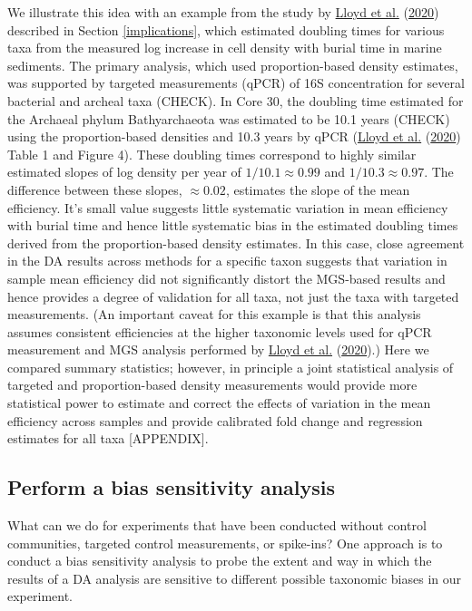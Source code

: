 \documentclass[
]{article}
\theoremstyle{definition}
\theoremstyle{definition}
\theoremstyle{definition}
\theoremstyle{definition}
\theoremstyle{remark}
\begin{document}
We illustrate this idea with an example from the study by \protect\hyperlink{ref-lloyd2020evid}{Lloyd et al.} (\protect\hyperlink{ref-lloyd2020evid}{2020}) described in Section \ref{implications}, which estimated doubling times for various taxa from the measured log increase in cell density with burial time in marine sediments.
The primary analysis, which used proportion-based density estimates, was supported by targeted measurements (qPCR) of 16S concentration for several bacterial and archeal taxa (CHECK).
In Core 30, the doubling time estimated for the Archaeal phylum Bathyarchaeota was estimated to be 10.1 years (CHECK) using the proportion-based densities and 10.3 years by qPCR (\protect\hyperlink{ref-lloyd2020evid}{Lloyd et al.} (\protect\hyperlink{ref-lloyd2020evid}{2020}) Table 1 and Figure 4).
These doubling times correspond to highly similar estimated slopes of log density per year of \(1/10.1 \approx 0.99\) and \(1/10.3\approx 0.97\).
The difference between these slopes, \(\approx 0.02\), estimates the slope of the mean efficiency.
It's small value suggests little systematic variation in mean efficiency with burial time and hence little systematic bias in the estimated doubling times derived from the proportion-based density estimates.
In this case, close agreement in the DA results across methods for a specific taxon suggests that variation in sample mean efficiency did not significantly distort the MGS-based results and hence provides a degree of validation for all taxa, not just the taxa with targeted measurements.
(An important caveat for this example is that this analysis assumes consistent efficiencies at the higher taxonomic levels used for qPCR measurement and MGS analysis performed by \protect\hyperlink{ref-lloyd2020evid}{Lloyd et al.} (\protect\hyperlink{ref-lloyd2020evid}{2020}).)
Here we compared summary statistics; however, in principle a joint statistical analysis of targeted and proportion-based density measurements would provide more statistical power to estimate and correct the effects of variation in the mean efficiency across samples and provide calibrated fold change and regression estimates for all taxa {[}APPENDIX{]}.

\hypertarget{perform-a-bias-sensitivity-analysis}{%
\subsection{Perform a bias sensitivity analysis}\label{perform-a-bias-sensitivity-analysis}}

What can we do for experiments that have been conducted without control communities, targeted control measurements, or spike-ins?
One approach is to conduct a bias sensitivity analysis to probe the extent and way in which the results of a DA analysis are sensitive to different possible taxonomic biases in our experiment.
\end{document}
